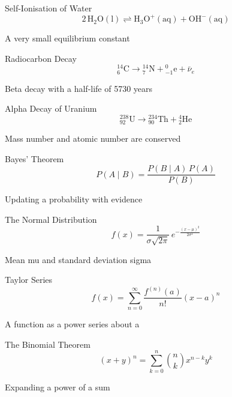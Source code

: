 \documentclass[aspectratio=169]{beamer}
\begin{document}
\begin{frame}{Self-Ionisation of Water}
\centering
\label{eq016}{\huge \[ 2\,\mathrm{H_2O(l)} \rightleftharpoons \mathrm{H_3O^+(aq)} + \mathrm{OH^-(aq)} \]}
\vspace{0.6em}

{\small A very small equilibrium constant}
\end{frame}
\begin{frame}{Radiocarbon Decay}
\centering
\label{eq017}{\huge \[ {}^{14}_{6}\mathrm{C} \longrightarrow {}^{14}_{7}\mathrm{N} + {}^{0}_{-1}\mathrm{e} + \bar{\nu}_{e} \]}
\vspace{0.6em}

{\small Beta decay with a half-life of 5730 years}
\end{frame}
\begin{frame}{Alpha Decay of Uranium}
\centering
\label{eq018}{\huge \[ {}^{238}_{92}\mathrm{U} \longrightarrow {}^{234}_{90}\mathrm{Th} + {}^{4}_{2}\mathrm{He} \]}
\vspace{0.6em}

{\small Mass number and atomic number are conserved}
\end{frame}
\begin{frame}{Bayes' Theorem}
\centering
\label{eq019}{\Huge \[ P(A \mid B) = \frac{P(B \mid A)\,P(A)}{P(B)} \]}
\vspace{0.6em}

{\small Updating a probability with evidence}
\end{frame}
\begin{frame}{The Normal Distribution}
\centering
\label{eq020}{\huge \[ f(x) = \frac{1}{\sigma\sqrt{2\pi}}\, e^{-\frac{(x-\mu)^2}{2\sigma^2}} \]}
\vspace{0.6em}

{\small Mean mu and standard deviation sigma}
\end{frame}
\begin{frame}{Taylor Series}
\centering
\label{eq021}{\huge \[ f(x) = \sum_{n=0}^{\infty} \frac{f^{(n)}(a)}{n!}(x - a)^n \]}
\vspace{0.6em}

{\small A function as a power series about a}
\end{frame}
\begin{frame}{The Binomial Theorem}
\centering
\label{eq022}{\huge \[ (x + y)^n = \sum_{k=0}^{n} \binom{n}{k} x^{n-k} y^k \]}
\vspace{0.6em}

{\small Expanding a power of a sum}
\end{frame}
\end{document}
